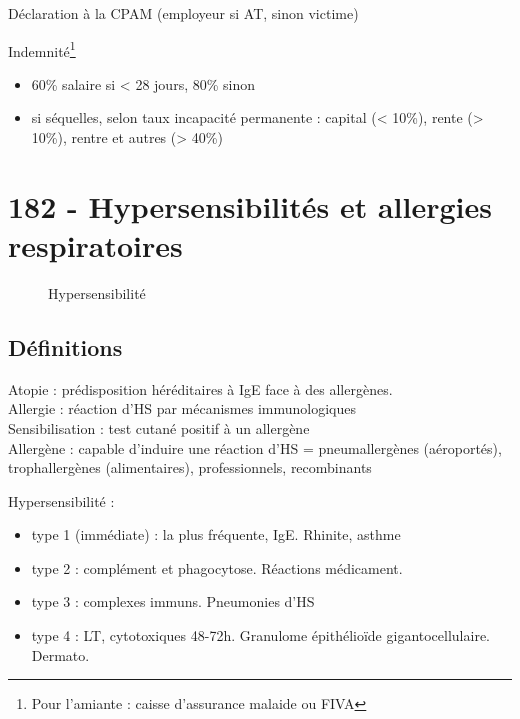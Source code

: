 \documentclass{book}
\begin{document}
Déclaration à la CPAM (employeur si AT, sinon victime)

Indemnité\footnote{Pour l'amiante : caisse d'assurance malaide ou FIVA}

\begin{itemize}
\item 60\% salaire si < 28 jours, 80\% sinon
\item si séquelles, selon taux incapacité permanente : capital (< 10\%), rente
(> 10\%), rentre et autres (> 40\%)
\end{itemize}

\section{182 \textdagger{} - Hypersensibilités et allergies respiratoires}
\label{sec:org8147a8f}
\label{sec:182_hypersensibilites_et_allergies_respiratoires}

\begin{figure}[htpb]
  \centering
  \caption{Hypersensibilité}
\end{figure}
\subsection{Définitions}
\label{sec:org7a2a3e0}
Atopie : prédisposition héréditaires à IgE face à des allergènes.\\
Allergie : réaction d'HS par mécanismes immunologiques\\
Sensibilisation : test cutané positif à un allergène\\
Allergène : capable d'induire une réaction d'HS = pneumallergènes (aéroportés),
trophallergènes (alimentaires), professionnels, recombinants

Hypersensibilité :

\begin{itemize}
\item type 1 (immédiate) : la plus fréquente, IgE. Rhinite, asthme
\item type 2 : complément et phagocytose. Réactions médicament.
\item type 3 : complexes immuns. Pneumonies d'HS
\item type 4 : LT, cytotoxiques 48-72h. Granulome épithélioïde gigantocellulaire.
Dermato.
\end{itemize}
\end{document}
